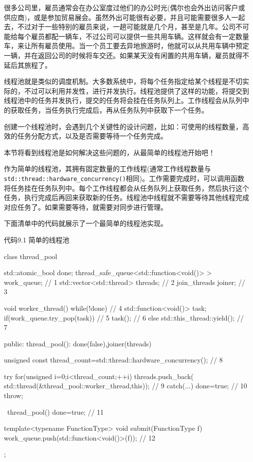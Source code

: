 
很多公司里，雇员通常会在办公室度过他们的办公时光(偶尔也会外出访问客户或供应商)，或是参加贸易展会。虽然外出可能很有必要，并且可能需要很多人一起去，不过对于一些特别的雇员来说，一趟可能就是几个月，甚至是几年。公司不可能给每个雇员都配一辆车，不过公司可以提供一些共用车辆。这样就会有一定数量车，来让所有雇员使用。当一个员工要去异地旅游时，他就可以从共用车辆中预定一辆，并在返回公司的时候将车交还。如果某天没有闲置的共用车辆，雇员就得不延后其旅程了。

线程池就是类似的调度机制。大多数系统中，将每个任务指定给某个线程是不切实际的，不过可以利用并发性，进行并发执行。线程池提供了这样的功能，将提交到线程池中的任务并发执行，提交的任务将会挂在任务队列上。工作线程会从队列中的获取任务，当任务执行完成后，再从任务队列中获取下一个任务。

创建一个线程池时，会遇到几个关键性的设计问题，比如：可使用的线程数量，高效的任务分配方式，以及是否需要等待一个任务完成。

本节将看到线程池是如何解决这些问题的，从最简单的线程池开始吧！


作为简单的线程池，其拥有固定数量的工作线程(通常工作线程数量与\texttt{std::thread::hardware\_concurrency()}相同)。工作需要完成时，可以调用函数将任务挂在任务队列中。每个工作线程都会从任务队列上获取任务，然后执行这个任务，执行完成后再回来获取新的任务。线程池中线程就不需要等待其他线程完成对应任务了。如果需要等待，就需要对同步进行管理。

下面清单中的代码就展示了一个最简单的线程池实现。

代码9.1 简单的线程池

\begin{cpp}
class thread_pool
{
  std::atomic_bool done;
  thread_safe_queue<std::function<void()> > work_queue;  // 1
  std::vector<std::thread> threads;  // 2
  join_threads joiner;  // 3

  void worker_thread()
  {
    while(!done)  // 4
    {
      std::function<void()> task;
      if(work_queue.try_pop(task))  // 5
      {
        task();  // 6
      }
      else
      {
        std::this_thread::yield();  // 7
      }
    }
  }

public:
  thread_pool():
    done(false),joiner(threads)
  {
    unsigned const thread_count=std::thread::hardware_concurrency();  // 8

    try
    {
      for(unsigned i=0;i<thread_count;++i)
      {
        threads.push_back(
          std::thread(&thread_pool::worker_thread,this));  // 9
      }
    }
    catch(...)
    {
      done=true;  // 10
      throw;
    }
  }

  ~thread_pool()
  {
    done=true;  // 11
  }

  template<typename FunctionType>
  void submit(FunctionType f)
  {
    work_queue.push(std::function<void()>(f));  // 12
  }
};
\end{cpp}

